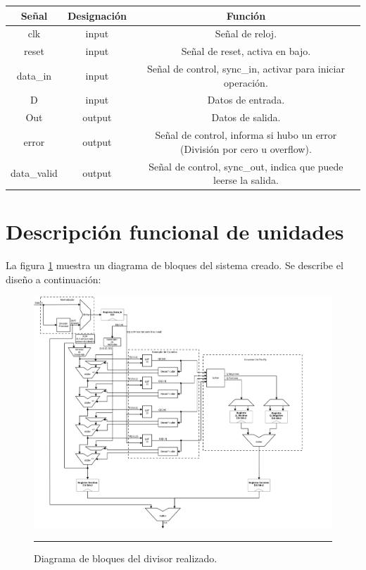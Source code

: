 \documentclass[12pt,a4paper]{article} %
\begin{document}
\begin{tabular}{c||c||c}
Señal & Designación & Función\\
\hline
\hline
clk & input & Señal de reloj. \\
reset & input & Señal de reset, activa en bajo. \\
data\_in & input & Señal de control, sync\_in, activar para iniciar operación. \\
D & input & Datos de entrada. \\
\hline
Out & output & Datos de salida. \\
error & output & Señal de control, informa si hubo un error (División por cero u overflow). \\
data\_valid & output & Señal de control, sync\_out, indica que puede leerse la salida. \\
\end{tabular}

\section{Descripción funcional de unidades}

La figura \ref{fig:Bloques} muestra un diagrama de bloques del sistema creado. Se describe el diseño a continuación:

\begin{figure}[htbp]
  \centering
    \includegraphics[scale=0.385, angle=270]{./Divisor.png}
    \rule{35em}{0.5pt}
  \caption[Bloques]{Diagrama de bloques del divisor realizado.}
  \label{fig:Bloques}
\end{figure}
\end{document}
